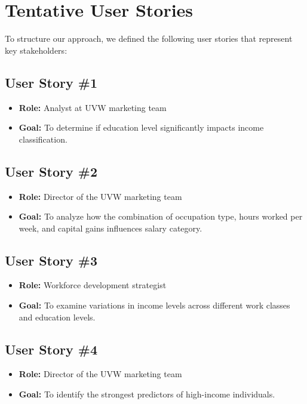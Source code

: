 \documentclass[journal]{IEEEtran}
\begin{document}
\section{Tentative User Stories}
To structure our approach, we defined the following user stories that represent key stakeholders:

\subsection{User Story \#1}
\begin{itemize}
    \item \textbf{Role:} Analyst at UVW marketing team
    \item \textbf{Goal:} To determine if education level significantly impacts income classification.
\end{itemize}

\subsection{User Story \#2}
\begin{itemize}
    \item \textbf{Role:} Director of the UVW marketing team
    \item \textbf{Goal:} To analyze how the combination of occupation type, hours worked per week, and capital gains influences salary category.
\end{itemize}

\subsection{User Story \#3}
\begin{itemize}
    \item \textbf{Role:} Workforce development strategist
    \item \textbf{Goal:} To examine variations in income levels across different work classes and education levels.
\end{itemize}

\subsection{User Story \#4}
\begin{itemize}
    \item \textbf{Role:} Director of the UVW marketing team
    \item \textbf{Goal:} To identify the strongest predictors of high-income individuals.
\end{itemize}
\end{document}
